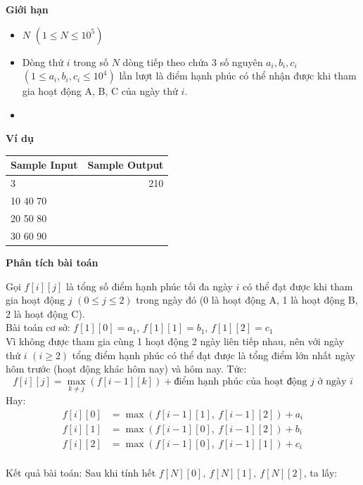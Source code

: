 \documentclass{article}
\begin{document}
\textbf{Giới hạn}
\begin{itemize}
    \item $N$ $(1 \leq N \leq 10^5)$
    \item Dòng thứ $i$ trong số $N$ dòng tiếp theo chứa 3 số nguyên $a_i, b_i, c_i$ $(1 \leq a_i, b_i, c_i \leq 10^4)$ lần lượt là điểm hạnh phúc có thể nhận được khi tham gia hoạt động A, B, C của ngày thứ $i$.
    \item 
\end{itemize}

\textbf{Ví dụ}

\begin{table}[h]
    \centering
    \begin{tabular}{|l|r|}
        \hline
        \textbf{Sample Input} & \textbf{Sample Output} \\
        \hline
		3& 210 \\ 
		10 40 70&  \\
        20 50 80 & \\
        30 60 90 & \\ 
		\hline
    \end{tabular}
\end{table}

\textbf{Phân tích bài toán}

Gọi $f[i][j]$ là tổng số điểm hạnh phúc tối đa ngày $i$ có thể đạt được khi tham gia hoạt động $j$ $(0 \leq j \leq 2)$ trong ngày đó (0 là hoạt động A, 1 là hoạt động B, 2 là hoạt động C).\\

Bài toán cơ sở: $f[1][0] = a_1$, $f[1][1] = b_1$, $f[1][2] = c_1$\\

Vì không được tham gia cùng 1 hoạt động 2 ngày liên tiếp nhau, nên với ngày thứ $i$ $(i \geq 2)$ tổng điểm hạnh phúc có thể đạt được là tổng điểm lớn nhất ngày hôm trước (hoạt động khác hôm nay) và hôm nay. Tức: 
\[
f[i][j] = \max_{k \ne j} \left( f[i-1][k] \right) + \text{điểm hạnh phúc của hoạt động $j$ ở ngày $i$}
\]
Hay:
\[
\begin{aligned}
f[i][0] &= \max \left( f[i-1][1],\ f[i-1][2] \right) + a_i \\
f[i][1] &= \max \left( f[i-1][0],\ f[i-1][2] \right) + b_i \\
f[i][2] &= \max \left( f[i-1][0],\ f[i-1][1] \right) + c_i \\
\end{aligned}
\]

Kết quả bài toán:
Sau khi tính hết \( f[N][0],\ f[N][1],\ f[N][2] \), ta lấy:
\end{document}
